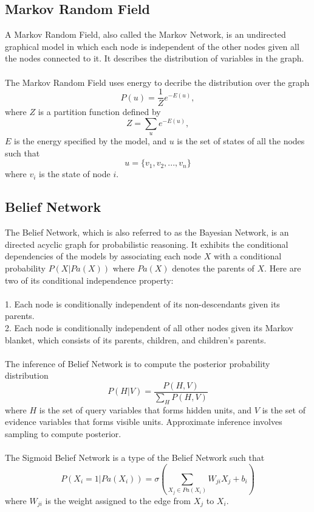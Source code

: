 \documentclass[12pt]{article}
\begin{document}
\subsection{Markov Random Field}
A Markov Random Field, also called the Markov Network, is an undirected graphical model in which each node is independent of the other nodes given all the nodes connected to it. It describes the distribution of variables in the graph.\\
\\
The Markov Random Field uses energy to decribe the distribution over the graph\begin{equation}
P(u) = \frac{1}{Z} e^{-E(u)},
\end{equation}
where $Z$ is a partition function defined by \begin{equation}
Z = \sum_{u} e^{-E(u)},
\end{equation}
$E$ is the energy specified by the model, and $u$ is the set of states of all the nodes such that \begin{equation}
u=\{v_1, v_2,...,v_n \}
\end{equation}
where $v_i$ is the state of node $i$.
\subsection{Belief Network}
The Belief Network, which is also referred to as the Bayesian Network, is an directed acyclic graph for probabilistic reasoning. It exhibits the conditional dependencies of the models by associating each node $X$ with a conditional probability $P(X|Pa(X))$ where $Pa(X)$ denotes the parents of $X$. Here are two of its conditional independence property:\\
\\
1. Each node is conditionally independent of its non-descendants given its parents.\\
2. Each node is conditionally independent of all other nodes given its Markov blanket, which consists of its parents, children, and children's parents.\\
\\
The inference of Belief Network is to compute the posterior probability distribution\begin{equation}
P(H|V) = \frac{P(H, V)}{\sum_H P(H,V)}
\end{equation}
where $H$ is the set of query variables that forms hidden units, and $V$ is the set of evidence variables that forms visible units. Approximate inference involves sampling to compute posterior.\\
\\
The Sigmoid Belief Network is a type of the Belief Network such that \begin{equation}
P(X_i=1|Pa(X_i)) = \sigma(\sum_{X_j\in Pa(X_i)} W_{ji} X_j + b_i)
\end{equation}
where $W_{ji}$ is the weight assigned to the edge from $X_j$ to $X_i$. 
\end{document}
